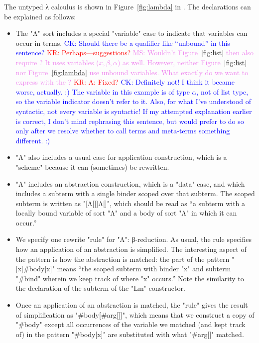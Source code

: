 \documentclass[letterpaper,11pt]{article}
\newcommand{\CK}[1]{\textcolor{blue}{CK: #1}}
\newcommand{\KR}[1]{\textcolor{red}{KR: #1}}
\newcommand{\MS}[1]{\textcolor{violet}{MS: #1}}
\begin{document}
\begin{example}\label{ex:lambda}
  The untyped λ calculus is shown in Figure~\ref{fig:lambda} in \hax.  The declarations can be
  explained as follows:
  \begin{itemize}

  \item The "Λ" sort includes a special "variable" case to indicate that variables can occur in
    terms. \CK{Should there be a qualifier like ``unbound'' in this sentence?}
    \KR{Perhaps---suggestions?} \MS{Wouldn't Figure~\ref{fig:list} then also require \kw{variable}?
      It uses variables ($x, \beta, \alpha$) as well. However, neither Figure~\ref{fig:list} nor
      Figure~\ref{fig:lambda} use unbound variables. What exactly do we want to express with the
      \kw{variable}?} \KR{A: Fixed?} 
    \CK{Definitely not! I think it became worse, actually. :)  The variable in this example is
      of type $\alpha$, not of list type, so the variable indicator doesn't refer to it.  Also,
      for what I've understood of syntactic, not every variable is syntactic!  If my attempted
      explanation earlier is correct, I don't mind rephrasing this sentence, but would prefer to
      do so only after we resolve whether to call terms and meta-terms something different. :)}

  \item "Λ" also includes a usual case for application construction, which is a "scheme" because it
    can (sometimes) be rewritten.

  \item "Λ" includes an abstraction construction, which is a "data" case, and which includes a
    subterm with a single binder scoped over that subterm. The scoped subterm is written as
    "[Λ[]]Λ[]", which should be read as ``a subterm with a locally bound variable of sort "Λ" and a
    body of sort "Λ" in which it can occur.''

  \item We specify one rewrite "rule" for "Λ": β-reduction. As usual, the rule specifies how an
    application of an abstraction is simplified. The interesting aspect of the pattern is how the
    abstraction is matched: the part of the pattern "[x]#body[x]" means ``the scoped subterm with
    binder "x" and subterm "#bind" wherein we keep track of where "x" occurs.'' Note the similarity
    to the declaration of the subterm of the "Lm" constructor.

  \item Once an application of an abstraction is matched, the "rule" gives the result of
    simplification as "#body[#arg[]]", which means that we construct a copy of "#body" except all
    occurrences of the variable we matched (and kept track of) in the pattern "#body[x]" are
    substituted with what "#arg[]" matched.


\end{itemize}
\end{example}
\end{document}
